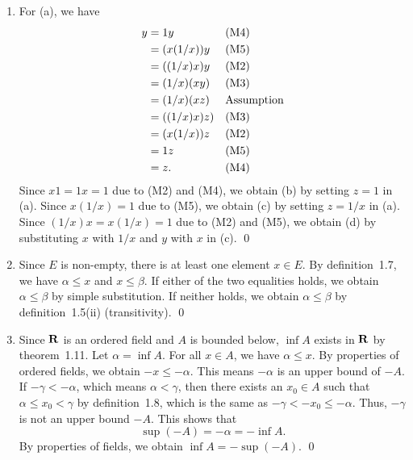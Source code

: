 \begin{enumerate}
\item For (a), we have
  \begin{align*}
    y
    &= 1y
    && \text{(M4)} \\
    &= (x(1/x))y
    && \text{(M5)} \\
    &= ((1/x)x)y
    && \text{(M2)} \\
    &= (1/x)(xy)
    && \text{(M3)} \\
    &= (1/x)(xz)
    && \text{Assumption} \\
    &= ((1/x)x)z)
    && \text{(M3)} \\
    &= (x(1/x))z
    && \text{(M2)} \\
    &= 1z
    && \text{(M5)} \\
    &= z.
    && \text{(M4)}
  \end{align*}
  Since \(x1 = 1x = 1\) due to (M2) and (M4), we obtain (b) by setting \(z = 1\) in (a).  Since \(x(1/x) = 1\) due to (M5), we obtain (c) by setting \(z = 1/x\) in (a).  Since \((1/x)x = x(1/x) = 1\) due to (M2) and (M5), we obtain (d) by substituting \(x\) with \(1/x\) and \(y\) with \(x\) in (c).
  \qed

\item Since \(E\) is non-empty, there is at least one element \(x \in E\).  By definition~1.7, we have \(α \le x\) and \(x \le β\).  If either of the two equalities holds, we obtain \(α \le β\) by simple substitution.  If neither holds, we obtain \(α \le β\) by definition~1.5(ii) (transitivity).
  \qed

\item Since \(\mathbf{R}\) is an ordered field and \(A\) is bounded below, \(\inf A\) exists in \(\mathbf{R}\) by theorem~1.11.  Let \(α = \inf A\).  For all \(x \in A\), we have \(α \le x\).  By properties of ordered fields, we obtain \(-x \le -α\).  This means \(-α\) is an upper bound of \(-A\).  If \(-γ < -α\), which means \(α < γ\), then there exists an \(x_0 \in A\) such that \(α \le x_0 < γ\) by definition~1.8, which is the same as \(-γ < -x_0 \le -α\). Thus, \(-γ\) is not an upper bound \(-A\).  This shows that
  \begin{equation*}
    \sup(-A) = -α = -\inf A.
  \end{equation*}
  By properties of fields, we obtain \(\inf A = -\sup(-A)\).
  \qed
\end{enumerate}

